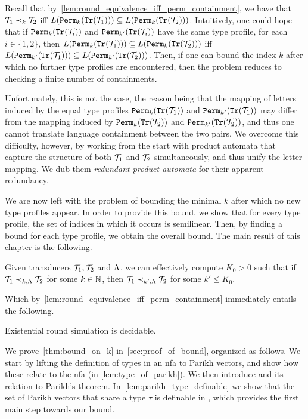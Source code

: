 Recall that by~\cref{lem:round_equivalence_iff_perm_containment}, we have that $\mathcal{T}_1\prec_k \mathcal{T}_2$ iff $L({\mathtt{Perm}}_k({\mathtt{Tr}}(\mathcal{T}_1)))\subseteq L({\mathtt{Perm}}_{k}({\mathtt{Tr}}(\mathcal{T}_2)))$.
Intuitively, one could hope that if ${\mathtt{Perm}}_k({\mathtt{Tr}}(\mathcal{T}_i))$ and ${\mathtt{Perm}}_{k'}({\mathtt{Tr}}(\mathcal{T}_i))$ have the same type profile, for each $i\in \{1,2\}$, then $L({\mathtt{Perm}}_k({\mathtt{Tr}}(\mathcal{T}_1)))\subseteq L({\mathtt{Perm}}_{k}({\mathtt{Tr}}(\mathcal{T}_2)))$ iff $L({\mathtt{Perm}}_{k'}({\mathtt{Tr}}(\mathcal{T}_1)))\subseteq L({\mathtt{Perm}}_{k'}({\mathtt{Tr}}(\mathcal{T}_2)))$. Then, if one can bound the index $k$ after which no further type profiles are encountered, then the problem reduces to checking a finite number of containments.

Unfortunately, this is not the case, the reason being
that the mapping of letters induced by the equal type profiles ${\mathtt{Perm}}_k({\mathtt{Tr}}(\mathcal{T}_1))$ and ${\mathtt{Perm}}_{k'}({\mathtt{Tr}}(\mathcal{T}_1))$ may differ from the mapping induced by ${\mathtt{Perm}}_k({\mathtt{Tr}}(\mathcal{T}_2))$ and ${\mathtt{Perm}}_{k'}({\mathtt{Tr}}(\mathcal{T}_2))$, and thus one cannot translate language containment between the two pairs. We overcome this difficulty, however, by working from the start with product automata that capture the structure of both $\mathcal{T}_1$ and $\mathcal{T}_2$ simultaneously, and thus unify the letter mapping. We dub them \emph{redundant product automata} for their apparent redundancy.

We are now left with the problem of bounding the minimal $k$ after which 
no new type profiles appear.
In order to provide this bound, we show that for every type profile, the set of indices in which it occurs is semilinear. Then, by finding a bound for each type profile, we obtain the overall bound. 
The main result of this chapter is the following.
\begin{theorem}
\label{thm:bound_on_k}	
	Given transducers $\mathcal{T}_1,\mathcal{T}_2$ and $\Lambda$, we can effectively compute $K_0>0$ such that if $\mathcal{T}_1\prec_{k,\Lambda} \mathcal{T}_2$ for some $k\in \mathbb{N}$, then $\mathcal{T}_1\prec_{k',\Lambda} \mathcal{T}_2$ for some $k'\le K_0$.
\end{theorem}
Which by~\cref{lem:round_equivalence_iff_perm_containment} immediately entails the following.
\begin{corollary}
\label{cor:exist_k_decidable}
Existential round simulation is decidable.
\end{corollary}

We prove~\cref{thm:bound_on_k} in~\cref{sec:proof_of_bound}, organized as follows. We start by lifting the definition of types in an \gls{nfa} to Parikh vectors, and show how these relate to the \gls{nfa} (in \cref{lem:type_of_parikh}). We then introduce  and its relation to Parikh's theorem. In~\cref{lem:parikh_type_definable} we show that the set of Parikh vectors that share a type $\tau$ is definable in , which provides the first main step towards our bound.

